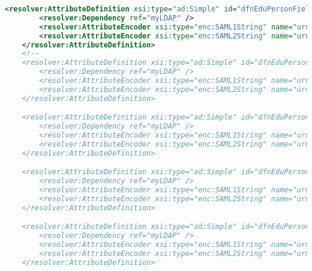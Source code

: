 \begin{lstlisting}[language=xml]
    <resolver:AttributeDefinition xsi:type="ad:Simple" id="dfnEduPersonFieldOfStudyString" sourceAttributeID="dfnEduPersonFieldOfStudyString">
        <resolver:Dependency ref="myLDAP" />
        <resolver:AttributeEncoder xsi:type="enc:SAML1String" name="urn:mace:dir:attribute-def:dfnEduPersonFieldOfStudyString" />
        <resolver:AttributeEncoder xsi:type="enc:SAML2String" name="urn:oid:1.3.6.1.4.1.22177.400.1.1.3.5" friendlyName="dfnEduPersonFieldOfStudyString" />
    </resolver:AttributeDefinition>
    <!--
    <resolver:AttributeDefinition xsi:type="ad:Simple" id="dfnEduPersonFinalDegree" sourceAttributeID="dfnEduPersonFinalDegree">
        <resolver:Dependency ref="myLDAP" />
        <resolver:AttributeEncoder xsi:type="enc:SAML1String" name="urn:mace:dir:attribute-def:dfnEduPersonFinalDegree" />
        <resolver:AttributeEncoder xsi:type="enc:SAML2String" name="urn:oid:1.3.6.1.4.1.22177.400.1.1.3.6" friendlyName="dfnEduPersonFinalDegree" />
    </resolver:AttributeDefinition>

    <resolver:AttributeDefinition xsi:type="ad:Simple" id="dfnEduPersonTypeOfStudy" sourceAttributeID="dfnEduPersonTypeOfStudy">
        <resolver:Dependency ref="myLDAP" />
        <resolver:AttributeEncoder xsi:type="enc:SAML1String" name="urn:mace:dir:attribute-def:dfnEduPersonTypeOfStudy" />
        <resolver:AttributeEncoder xsi:type="enc:SAML2String" name="urn:oid:1.3.6.1.4.1.22177.400.1.1.3.7" friendlyName="dfnEduPersonTypeOfStudy" />
    </resolver:AttributeDefinition>

    <resolver:AttributeDefinition xsi:type="ad:Simple" id="dfnEduPersonTermsOfStudy" sourceAttributeID="dfnEduPersonTermsOfStudy">
        <resolver:Dependency ref="myLDAP" />
        <resolver:AttributeEncoder xsi:type="enc:SAML1String" name="urn:mace:dir:attribute-def:dfnEduPersonTermsOfStudy" />
        <resolver:AttributeEncoder xsi:type="enc:SAML2String" name="urn:oid:1.3.6.1.4.1.22177.400.1.1.3.8" friendlyName="dfnEduPersonTermsOfStudy" />
    </resolver:AttributeDefinition>

    <resolver:AttributeDefinition xsi:type="ad:Simple" id="dfnEduPersonBranchAndDegree" sourceAttributeID="dfnEduPersonBranchAndDegree">
        <resolver:Dependency ref="myLDAP" />
        <resolver:AttributeEncoder xsi:type="enc:SAML1String" name="urn:mace:dir:attribute-def:dfnEduPersonBranchAndDegree" />
        <resolver:AttributeEncoder xsi:type="enc:SAML2String" name="urn:oid:1.3.6.1.4.1.22177.400.1.1.3.9" friendlyName="dfnEduPersonBranchAndDegree" />
    </resolver:AttributeDefinition>


\end{lstlisting}
